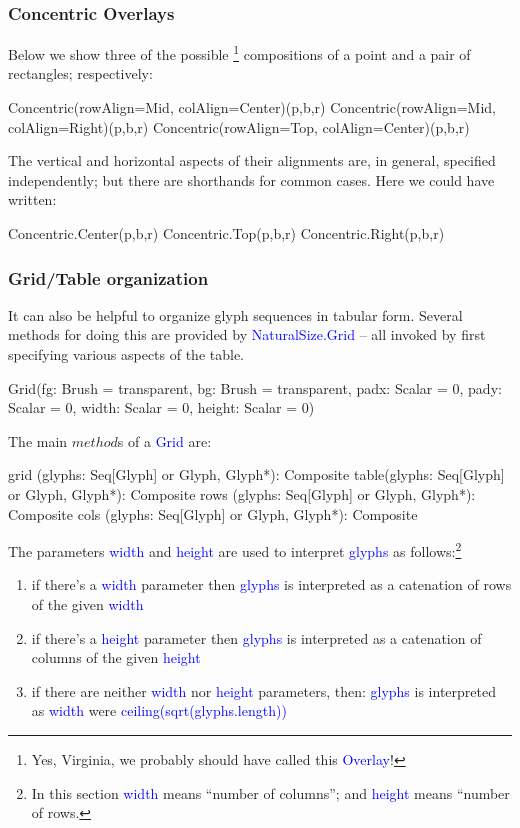 \documentclass[12pt,a4paper]{article}
\def\Scala#1{\textcolor{blue}{\textsf{#1}}}
\def\SSS#1{\subsubsection*{#1}}
\begin{document}
\SSS{Concentric Overlays}
Below we show three of the possible \footnote{Yes,
Virginia, we probably should have called this \Scala{Overlay}!} 
compositions of a point and a pair of rectangles; respectively:
\begin{scala}
        Concentric(rowAlign=Mid, colAlign=Center)(p,b,r)
        Concentric(rowAlign=Mid, colAlign=Right)(p,b,r)
        Concentric(rowAlign=Top, colAlign=Center)(p,b,r)      
\end{scala}

\begin{center}
\quad\quad
{}
\quad\quad
{} 
\end{center}


The vertical and horizontal aspects of their alignments are, in general,
specified independently; but there are shorthands for common cases. Here
we could have written:

\begin{scala}
        Concentric.Center(p,b,r)
        Concentric.Top(p,b,r)
        Concentric.Right(p,b,r)      
\end{scala}

\clearpage
\SSS{Grid/Table organization}

It can also be helpful to organize glyph sequences in tabular form.
Several methods for doing this are provided by \Scala{NaturalSize.Grid}
-- all invoked by first specifying various aspects of the table.
\begin{scala}
        Grid(fg:     Brush  = transparent,
             bg:     Brush  = transparent,
             padx:   Scalar = 0,
             pady:   Scalar = 0,
             width:  Scalar = 0,
             height: Scalar = 0)
\end{scala}

The main $method$s of a \Scala{Grid} are:
\begin{scala}
  grid (glyphs: Seq[Glyph] or Glyph, Glyph*): Composite
  table(glyphs: Seq[Glyph] or Glyph, Glyph*): Composite
  rows (glyphs: Seq[Glyph] or Glyph, Glyph*): Composite
  cols (glyphs: Seq[Glyph] or Glyph, Glyph*): Composite
\end{scala}

The parameters \Scala{width} and \Scala{height}  are used to interpret
\Scala{glyphs} as follows:\footnote{In this section
\Scala{width} means ``number of columns''; and \Scala{height} means
``number of rows.}
\begin{enumerate}
     \item  if there's a \Scala{width} parameter then \Scala{glyphs} is interpreted as a catenation of rows of the given \Scala{width}
     \item  if there's a \Scala{height} parameter then \Scala{glyphs} is interpreted as a catenation of columns of the given \Scala{height}
     \item  if there are neither \Scala{width} nor \Scala{height} parameters, then:
            \Scala{glyphs} is interpreted as \Scala{width} were \Scala{ceiling(sqrt(glyphs.length))}
\end{enumerate}
\end{document}
